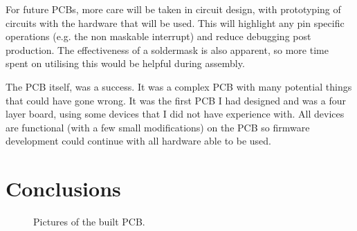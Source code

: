 For future PCBs, more care will be taken in circuit design, with prototyping of circuits with the hardware that will be used. This will highlight any pin specific operations (e.g. the non maskable interrupt) and reduce debugging post production. The effectiveness of a soldermask is also apparent, so more time spent on utilising this would be helpful during assembly.

The PCB itself, was a success. It was a complex PCB with many potential things that could have gone wrong. It was the first PCB I had designed and was a four layer board, using some devices that I did not have experience with. All devices are functional (with a few small modifications) on the PCB so firmware development could continue with all hardware able to be used.

\section{Conclusions}
\begin{figure}
\centering
{}
\caption{Pictures of the built PCB.}
\label{fig:PCB:Built}
\end{figure}

